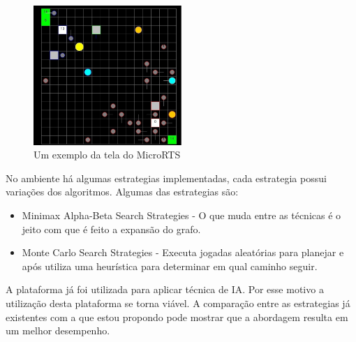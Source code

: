  \begin{figure}[ht]
 	\centering
 	\includegraphics[width=0.5\textwidth]{fig/microrts.pdf}
 	\caption{Um exemplo da tela do MicroRTS}
 	\label{fig:microrts}
 \end{figure} 
 
 No ambiente há algumas estrategias implementadas, cada estrategia possui variações dos algoritmos. Algumas das estrategias são:
 \begin{itemize}
 	\item Minimax Alpha-Beta Search Strategies - O que muda entre as técnicas é o jeito com que é feito a expansão do grafo.
 	\item Monte Carlo Search Strategies - Executa jogadas aleatórias para planejar e após utiliza uma heurística para determinar em qual caminho seguir.
 \end{itemize}
 
 A plataforma já foi utilizada para aplicar técnica de IA. Por esse motivo a utilização desta plataforma se torna viável. A comparação entre as estrategias já existentes com a que estou propondo pode mostrar que a abordagem resulta em um melhor desempenho. 
 
 
 
 